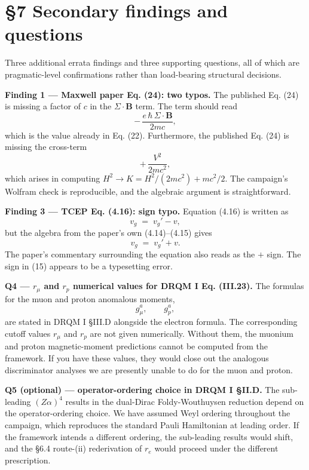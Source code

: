\documentclass[
  11pt,
]{article}
\begin{document}
\hypertarget{secondary-findings-and-questions}{%
\section{§7 Secondary findings and
questions}\label{secondary-findings-and-questions}}

Three additional errata findings and three supporting questions, all of
which are pragmatic-level confirmations rather than load-bearing
structural decisions.

\textbf{Finding 1 --- Maxwell paper Eq. (24): two typos.} The published
Eq. (24) is missing a factor of \(c\) in the \(\Sigma\cdot\mathbf{B}\)
term. The term should read \[
-\,\frac{e\,\hbar\,\Sigma\cdot\mathbf{B}}{2 m c},
\tag{13}
\] which is the value already in Eq. (22). Furthermore, the published
Eq. (24) is missing the cross-term \[
+\,\frac{V^{2}}{2 m c^{2}},
\tag{14}
\] which arises in computing
\(H^{2} \to K = H^{2}/(2 m c^{2}) + m c^{2}/2\). The campaign's Wolfram
check is reproducible, and the algebraic argument is straightforward.

\textbf{Finding 3 --- TCEP Eq. (4.16): sign typo.} Equation (4.16) is
written as \[
v_{g} \;=\; v_{g}' - v,
\tag{15}
\] but the algebra from the paper's own (4.14)--(4.15) gives \[
v_{g} \;=\; v_{g}' + v.
\tag{16}
\] The paper's commentary surrounding the equation also reads as the
\(+\) sign. The sign in (15) appears to be a typesetting error.

\textbf{Q4 --- \(r_{\mu}\) and \(r_{p}\) numerical values for DRQM I Eq.
(III.23).} The formulas for the muon and proton anomalous moments, \[
g_{\mu}^{a}, \qquad g_{p}^{a},
\tag{17}
\] are stated in DRQM I §III.D alongside the electron formula. The
corresponding cutoff values \(r_{\mu}\) and \(r_{p}\) are not given
numerically. Without them, the muonium and proton magnetic-moment
predictions cannot be computed from the framework. If you have these
values, they would close out the analogous discriminator analyses we are
presently unable to do for the muon and proton.

\textbf{Q5 (optional) --- operator-ordering choice in DRQM I §II.D.} The
sub-leading \((Z\alpha)^{4}\) results in the dual-Dirac Foldy-Wouthuysen
reduction depend on the operator-ordering choice. We have assumed Weyl
ordering throughout the campaign, which reproduces the standard Pauli
Hamiltonian at leading order. If the framework intends a different
ordering, the sub-leading results would shift, and the §6.4 route-(ii)
rederivation of \(r_{e}\) would proceed under the different
prescription.
\end{document}
